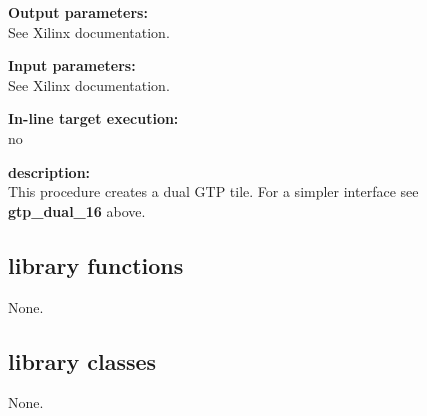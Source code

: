             {\bf Output parameters:} \\
            See Xilinx documentation.

            {\bf Input parameters:} \\
            See Xilinx documentation.

            {\bf In-line target execution:} \\
            no

            {\bf description:} \\
            This procedure creates a dual GTP tile. For a simpler interface
            see {\bf gtp\_dual\_16}  above.




    \subsection{library functions}
    
        None.






    \subsection{library classes}
    
        None.
